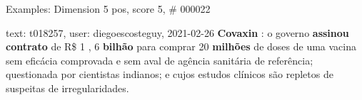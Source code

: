 \begin{frame}{Examples: Dimension 5 pos, score 5, \# 000022}
\footnotesize
\begin{exampleblock}{text: t018257, user: diegoescosteguy, 2021-02-26}
\textbf{Covaxin} : o governo \textbf{assinou} \textbf{contrato} de R\$ 1 , 6 
\textbf{bilhão} para comprar 20 \textbf{milhões} de doses de uma vacina sem 
eficácia comprovada e sem aval de agência sanitária de referência; questionada 
por cientistas indianos; e cujos estudos clínicos são repletos de suspeitas de 
irregularidades. 
\end{exampleblock}
\end{frame}
